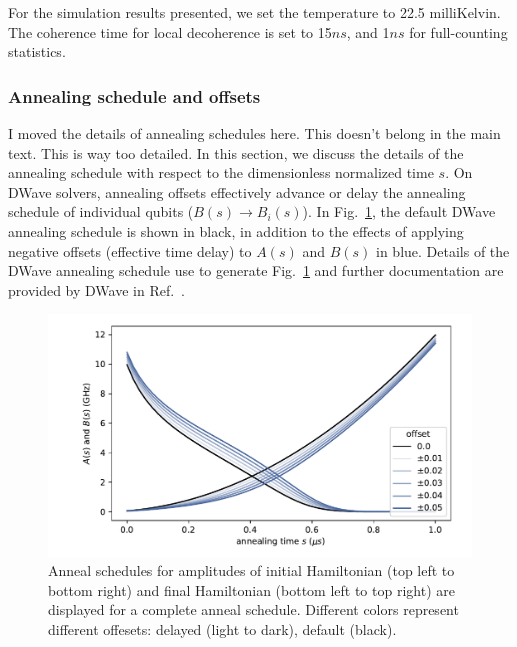 \documentclass[prd,twocolumn,tightenlines,preprintnumbers,showpacs,superscriptaddress,notitlepage,nofootinbib,eqsecnum,floatfix,longbibliography,aps,10pt]{revtex4-2}
\begin{document}
{\color{green}For the simulation results presented, we set the temperature to 22.5 milliKelvin. The coherence time for local decoherence is set to 15$ns$, and 1$ns$ for full-counting statistics.
}
\subsubsection{Annealing schedule and offsets}
\label{sec:methods:annealing-schedule}
{\color{red} I moved the details of annealing schedules here. This doesn't belong in the main text. This is way too detailed.}
In this section, we discuss the details of the annealing schedule with respect to the dimensionless normalized time $s$. On DWave solvers, annealing offsets effectively advance or delay the annealing schedule of individual qubits ($B(s) \to B_i(s)$).
In Fig.~\ref{fig:anneal_schedule}, the default DWave annealing schedule is shown in black, in addition to the effects of applying negative offsets (effective time delay) to $A(s)$ and $B(s)$ in blue.
Details of the DWave annealing schedule use to generate Fig.~\ref{fig:anneal_schedule} and further documentation are provided by DWave in Ref.~\cite{dwave_as, dwave_as_docu}.

\begin{figure}[htb]
 \centering
  \includegraphics[width=\columnwidth]{./new_figures/anneal_schedule.pdf}
  \caption{
  Anneal schedules for amplitudes of initial Hamiltonian (top left to bottom right) and final Hamiltonian (bottom left to top right) are displayed for a complete anneal schedule.
  Different colors represent different offesets: delayed (light to dark), default (black).
 }
 \label{fig:anneal_schedule}
\end{figure}
\end{document}
